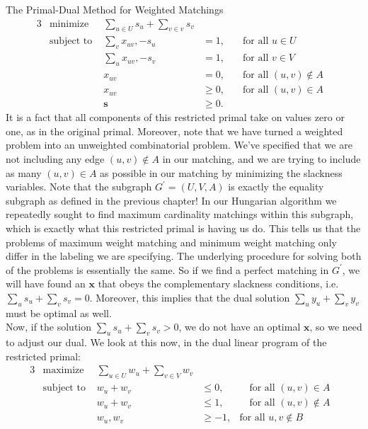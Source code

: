 \begin{section}{The Primal-Dual Method for Weighted Matchings}
	\begin{alignat}{3}
		& \text{minimize } & \sum_{u\in U} s_u + \sum_{v\in v} s_v & \\
		& \text{subject to } & \sum_v x_{uv}, - s_u & = 1, & \quad \text{for all } u\in U& \\
				     && \sum_u x_{uv}, - s_v & = 1, & \quad \text{for all } v\in V& \\
				     && x_{uv} & = 0, & \quad \text{for all }(u,v)\notin A \\
				     && x_{uv} & \geq 0, & \quad \text{for all } (u,v)\in A \\
				     && \mathbf{s} & \geq 0.
	\end{alignat}
	It is a fact that all components of this restricted primal take on values zero or one, as 
	in the original primal. Moreover, note that we have turned a weighted problem into an 
	unweighted combinatorial problem. We've specified that we are not including any edge 
	$(u,v)\notin A$ in our matching, and we are trying to include as many $(u,v)\in A$ as possible 
	in our matching by minimizing the slackness variables. Note that the subgraph $G^{'} = (U,V,A)$ 
	is exactly the equality subgraph as defined in the previous chapter! In our Hungarian algorithm 
	we repeatedly sought to find maximum cardinality matchings within this subgraph, which is 
	exactly what this restricted primal is having us do. This tells us that the problems of maximum 
	weight matching and minimum weight matching only differ in the labeling we are specifying. The 
	underlying procedure for solving both of the problems is essentially the same. So if we find a 
	perfect matching in $G^{'}$, we will have found an $\mathbf{x}$ that obeys the complementary 
	slackness conditions, i.e. $\sum_u s_u + \sum_v s_v = 0$. Moreover, this implies that the 
	dual solution $\sum_u y_u + \sum_v y_v$ must be optimal as well.\\
	Now, if the solution $\sum_u s_u + \sum_v s_v > 0$, we do not have an optimal $\mathbf{x}$, 
	so we need to adjust our dual. We look at this now, in the dual linear program of the 
	restricted primal:
	\begin{alignat}{3}
		& \text{maximize } & \sum_{u\in U} w_u + \sum_{v\in V} w_v & \\
		& \text{subject to } & w_u + w_v & \leq 0, & \quad \text{for all } (u,v)\in A & \\
				     && w_u + w_v & \leq 1, & \quad \text{for all } (u,v)\notin A & \\
				     && w_u,w_v & \geq -1, & \text{for all } u,v\notin B \\

\end{alignat}
\end{section}
